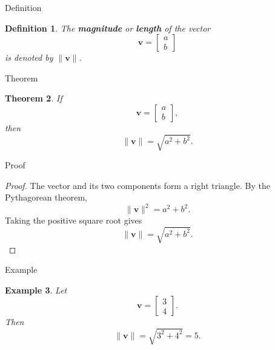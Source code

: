\documentclass[11pt,a4paper]{article}
\newtheorem{theorem}{Theorem}[section]
\newtheorem{definition}[theorem]{Definition}
\newtheorem{example}[theorem]{Example}
\newcommand{\vect}[1]{\boldsymbol{#1}}
\begin{document}
\begin{center}
\end{center}

\begin{mathblock}{Definition}
\begin{definition}
The \textbf{magnitude} or \textbf{length} of the vector
\[
\vect{v} =
\begin{bmatrix}
a \\ b
\end{bmatrix}
\]
is denoted by \(\lVert \vect{v} \rVert\).
\end{definition}
\end{mathblock}

\begin{mathblock}{Theorem}
\begin{theorem}
If
\[
\vect{v} =
\begin{bmatrix}
a \\ b
\end{bmatrix},
\]
then
\[
\lVert \vect{v} \rVert = \sqrt{a^2+b^2}.
\]
\end{theorem}
\end{mathblock}

\begin{mathblock}{Proof}
\begin{proof}
The vector and its two components form a right triangle.
By the Pythagorean theorem,
\[
\lVert \vect{v} \rVert^2 = a^2+b^2.
\]
Taking the positive square root gives
\[
\lVert \vect{v} \rVert = \sqrt{a^2+b^2}.
\]
\end{proof}
\end{mathblock}

\begin{mathblock}{Example}
\begin{example}
Let
\[
\vect{v} =
\begin{bmatrix}
3 \\ 4
\end{bmatrix}.
\]
Then
\[
\lVert \vect{v} \rVert = \sqrt{3^2+4^2} = 5.
\]
\end{example}
\end{mathblock}
\end{document}

